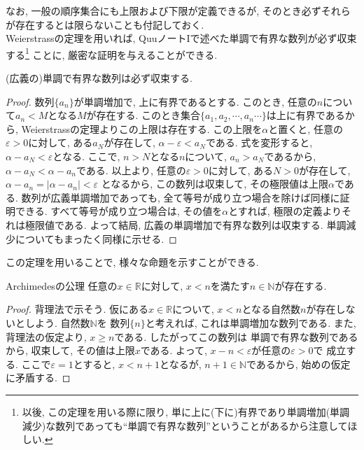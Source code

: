         なお, 一般の順序集合にも上限および下限が定義できるが, そのとき必ずそれらが存在するとは限らないことも付記しておく.\\

        Weierstrassの定理を用いれば, QuuノートIで述べた単調で有界な数列が必ず収束する\footnote{以後, この定理を用いる際に限り, 単に上に(下に)有界であり単調増加(単調減少)な数列であっても``単調で有界な数列''ということがあるから注意してほしい.}
        ことに, 厳密な証明を与えることができる. 
        \begin{screen}
            (広義の)単調で有界な数列は必ず収束する.
        \end{screen}
        \begin{proof}
            数列$\{a_n\}$が単調増加で, 上に有界であるとする. このとき, 任意の$n$について$a_n<M$となる$M$が存在する.
            このとき集合$\{a_1,a_2,\cdots,a_n\cdots\}$は上に有界であるから, Weierstrassの定理よりこの上限は存在する.
            この上限を$\alpha$と置くと, 任意の$\varepsilon>0$に対して, ある$a_{N}$が存在して, $\alpha - \varepsilon < a_{N}$である.
            式を変形すると, $\alpha -a_{N}< \varepsilon$となる. ここで, $n>N$となる$n$について, $a_n>a_N$であるから, 
            $\alpha - a_{N} < \alpha - a_{n}$である. 以上より, 任意の$\varepsilon>0$に対して, ある$N>0$が存在して, $\alpha-a_{n}=|\alpha - a_{n}|<\varepsilon$
            となるから, この数列は収束して, その極限値は上限$\alpha$である. 数列が広義単調増加であっても, 全て等号が成り立つ場合を除けば同様に証明できる. 
            すべて等号が成り立つ場合は, その値を$\alpha$とすれば, 極限の定義よりそれは極限値である. 
            よって結局, 広義の単調増加で有界な数列は収束する. 単調減少についてもまったく同様に示せる.
        \end{proof}

        この定理を用いることで, 様々な命題を示すことができる. 
        
        \begin{itembox}{Archimedesの公理}
            任意の$x\in\mathbb{R}$に対して, $x<n$を満たす$n\in \mathbb{N}$が存在する.
        \end{itembox}
        \begin{proof}
            背理法で示そう. 仮にある$x\in\mathbb{R}$について, $x<n$となる自然数$n$が存在しないとしよう. 自然数$\mathbb{N}$を
            数列$\{n\}$と考えれば, これは単調増加な数列である. また, 背理法の仮定より, $x\geq n$である. したがってこの数列は
            単調で有界な数列であるから, 収束して, その値は上限$x$である. よって, $x-n<\varepsilon$が任意の$\varepsilon>0$で
            成立する. ここで$\varepsilon=1$とすると, $x<n+1$となるが, $n+1\in\mathbb{N}$であるから, 始めの仮定に矛盾する.
        \end{proof}

